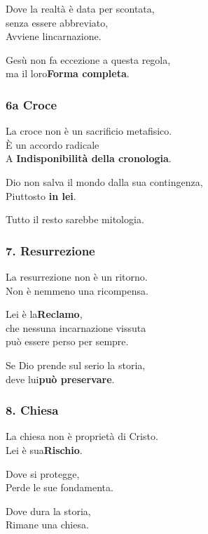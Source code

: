 \documentclass[
]{article}
\begin{document}
Dove la realtà è data per scontata,\\
senza essere abbreviato,\\
Avviene l\textquotesingle incarnazione.

Gesù non fa eccezione a questa regola,\\
ma il loro\textbf{Forma completa}.

\subsubsection{\texorpdfstring{\textbf{6a Croce}}{6a Croce}}\label{a-croce}

La croce non è un sacrificio metafisico.\\
È un accordo radicale\\
A \textbf{Indisponibilità della cronologia}.

Dio non salva il mondo dalla sua contingenza,\\
Piuttosto \textbf{in lei}.

Tutto il resto sarebbe mitologia.

\subsubsection{\texorpdfstring{\textbf{7. Resurrezione}}{7. Resurrezione}}\label{resurrezione}

La resurrezione non è un ritorno.\\
Non è nemmeno una ricompensa.

Lei è la\textbf{Reclamo},\\
che nessuna incarnazione vissuta\\
può essere perso per sempre.

Se Dio prende sul serio la storia,\\
deve lui\textbf{può preservare}.

\subsubsection{\texorpdfstring{\textbf{8. Chiesa}}{8. Chiesa}}\label{chiesa}

La chiesa non è proprietà di Cristo.\\
Lei è sua\textbf{Rischio}.

Dove si protegge,\\
Perde le sue fondamenta.

Dove dura la storia,\\
Rimane una chiesa.
\end{document}
